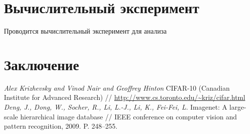 \documentclass[12pt]{a&t}
\begin{document}
\section{Вычислительный эксперимент}
Проводится вычислительный эксперимент для анализа 


\section{Заключение}

\begin{thebibliography}{10}
	\textit{Alex Krizhevsky and Vinod Nair and Geoffrey Hinton} CIFAR-10 (Canadian Institute for Advanced Research) // \url{http://www.cs.toronto.edu/~kriz/cifar.html}
	\textit{Deng, J., Dong, W., Socher, R., Li, L.-J., Li, K., Fei-Fei, L. } Imagenet: A large-scale hierarchical image database //  IEEE conference on computer vision and pattern recognition, 2009. P. 248--255. 
	

\end{thebibliography}
\end{document}
